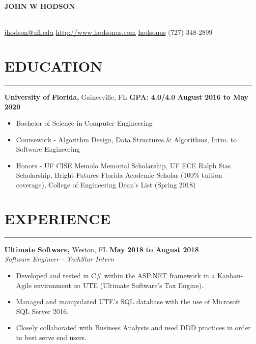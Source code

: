 \documentclass[11pt]{article} %
\begin{document}
	
	\noindent\centerline{ \huge\textbf{JOHN W HODSON}}\\
	
	\noindent\Email\space\href{mailto:jhodson@ufl.edu}{jhodson@ufl.edu} \hspace*{\fill} \ComputerMouse \space \href{http://www.hodsonus.com}{http://www.hodsonus.com} \hspace*{\fill} \faGithub \space \href{https://github.com/hodsonus}{hodsonus} \hspace*{\fill} \Mobilefone \space (727) 348-2899\\
	
	\section*{EDUCATION}
		\hrule \relax
		\vspace{.4cm}
		
		\noindent \textbf{University of Florida,} Gainesville, FL
		\hfill\textbf{GPA: 4.0/4.0}
		\hfill\textbf{August 2016 to May 2020}
		
		\begin{itemize}[noitemsep,nolistsep, label = {-}]
			\item Bachelor of Science in Computer Engineering
			\item Coursework - Algorithm Design, Data Structures \& Algorithms, Intro. to Software Engineering
			\item Honors - UF CISE Memolo Memorial Scholarship, UF ECE Ralph Sias Scholarship, Bright Futures Florida Academic Scholar (100\% tuition coverage), College of Engineering Dean\rq s List (Spring 2018)
		\end{itemize}
		
		\vspace{.1cm}
	
	\section*{EXPERIENCE}
		\hrule \relax
		\vspace{.4cm}
		
		\noindent \textbf{Ultimate Software,} Weston, FL \hfill\textbf{May 2018 to August 2018}\\
		\textit{Software Engineer - TechStar Intern}
		\begin{itemize}[noitemsep,nolistsep, label = {-}]
			\item Developed and tested in C\# within the ASP.NET framework in a Kanban-Agile environment on UTE (Ultimate Software's Tax Engine).
			\item Managed and manipulated UTE's SQL database with the use of Microsoft SQL Server 2016.
			\item Closely collaborated with Business Analysts and used DDD practices in order to best serve end users.
		\end{itemize}
	
\end{document}
